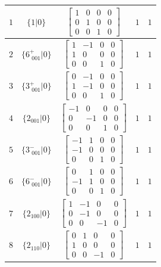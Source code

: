 \documentclass[fleqn,8pt]{jsarticle}
\begin{document}
\begin{longtable}{ccccc}
$ 1 $ & $ \{1|0\} $ & $ \begin{bmatrix} 1 & 0 & 0 & 0 \\ 0 & 1 & 0 & 0 \\ 0 & 0 & 1 & 0 \end{bmatrix} $ & $ 1 $ & $ 1 $ \\ \hline
$ 2 $ & $ \{6^{+}_{\,\,001}|0\} $ & $ \begin{bmatrix} 1 & -1 & 0 & 0 \\ 1 & 0 & 0 & 0 \\ 0 & 0 & 1 & 0 \end{bmatrix} $ & $ 1 $ & $ 1 $ \\ \hline
$ 3 $ & $ \{3^{+}_{\,\,001}|0\} $ & $ \begin{bmatrix} 0 & -1 & 0 & 0 \\ 1 & -1 & 0 & 0 \\ 0 & 0 & 1 & 0 \end{bmatrix} $ & $ 1 $ & $ 1 $ \\ \hline
$ 4 $ & $ \{2{}_{001}|0\} $ & $ \begin{bmatrix} -1 & 0 & 0 & 0 \\ 0 & -1 & 0 & 0 \\ 0 & 0 & 1 & 0 \end{bmatrix} $ & $ 1 $ & $ 1 $ \\ \hline
$ 5 $ & $ \{3^{-}_{\,\,001}|0\} $ & $ \begin{bmatrix} -1 & 1 & 0 & 0 \\ -1 & 0 & 0 & 0 \\ 0 & 0 & 1 & 0 \end{bmatrix} $ & $ 1 $ & $ 1 $ \\ \hline
$ 6 $ & $ \{6^{-}_{\,\,001}|0\} $ & $ \begin{bmatrix} 0 & 1 & 0 & 0 \\ -1 & 1 & 0 & 0 \\ 0 & 0 & 1 & 0 \end{bmatrix} $ & $ 1 $ & $ 1 $ \\ \hline
$ 7 $ & $ \{2{}_{100}|0\} $ & $ \begin{bmatrix} 1 & -1 & 0 & 0 \\ 0 & -1 & 0 & 0 \\ 0 & 0 & -1 & 0 \end{bmatrix} $ & $ 1 $ & $ 1 $ \\ \hline
$ 8 $ & $ \{2{}_{110}|0\} $ & $ \begin{bmatrix} 0 & 1 & 0 & 0 \\ 1 & 0 & 0 & 0 \\ 0 & 0 & -1 & 0 \end{bmatrix} $ & $ 1 $ & $ 1 $ \\ \hline

\end{longtable}
\end{document}
